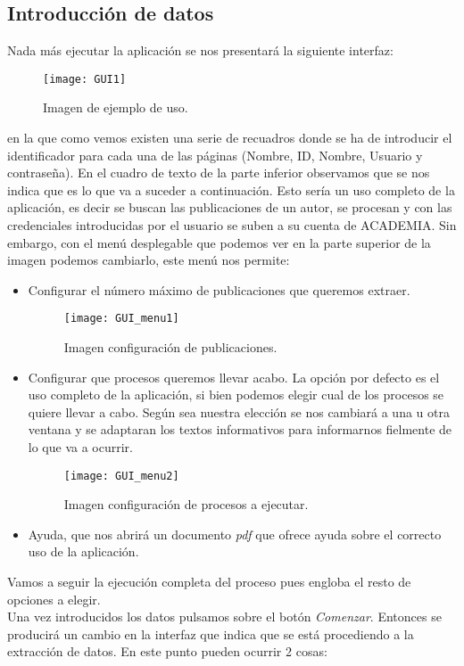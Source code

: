 \subsection{Introducción de datos}
Nada más ejecutar la aplicación se nos presentará la siguiente interfaz:
\begin{figure}[H]
	\centering
	\texttt{[image: GUI1]}
	\caption{Imagen de ejemplo de uso.}
\end{figure}
en la que como vemos existen una serie de recuadros donde se ha de introducir el identificador para cada una de las páginas (Nombre, ID, Nombre, Usuario y contraseña). En el cuadro de texto de la parte inferior observamos que se nos indica que es lo que va a suceder a continuación. Esto sería un uso completo de la aplicación, es decir se buscan las publicaciones de un autor, se procesan y con las credenciales introducidas por el usuario se suben a su cuenta de ACADEMIA. Sin embargo, con el menú desplegable que podemos ver en la parte superior de la imagen podemos cambiarlo, este menú nos permite:
\begin{itemize}
	\item Configurar el número máximo de publicaciones que queremos extraer.
	
	\begin{figure}[H]
	\centering
	\texttt{[image: GUI\_menu1]}
	\caption{Imagen configuración de publicaciones.}
	\end{figure}
	
	\item Configurar que procesos queremos llevar acabo. La opción por defecto es el uso completo de la aplicación, si bien podemos elegir cual de los procesos se quiere llevar a cabo. Según sea nuestra elección se nos cambiará a una u otra ventana y se adaptaran los textos informativos para informarnos fielmente de lo que va a ocurrir.
	
	\begin{figure}[H]
	\centering
	\texttt{[image: GUI\_menu2]}
	\caption{Imagen configuración de procesos a ejecutar.}
	\end{figure}
	
	\item Ayuda, que nos abrirá un documento \emph{pdf} que ofrece ayuda sobre el correcto uso de la aplicación.
\end{itemize}

Vamos a seguir la ejecución completa del proceso pues engloba el resto de opciones a elegir.\\ Una vez introducidos los datos pulsamos sobre el botón \emph{Comenzar}. Entonces se producirá un cambio en la interfaz que indica que se está procediendo a la extracción de datos.
En este punto pueden ocurrir 2 cosas:

